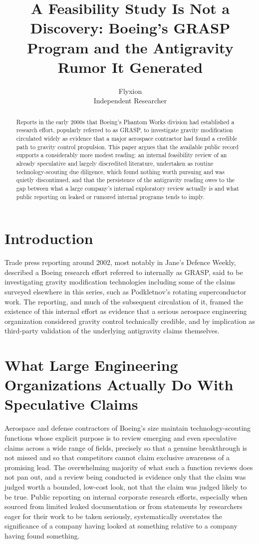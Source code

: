 \documentclass[11pt]{article}
\title{A Feasibility Study Is Not a Discovery: Boeing's GRASP Program and the Antigravity Rumor It Generated}
\author{Flyxion \\ \small Independent Researcher}
\date{}
\begin{document}
\maketitle

\begin{abstract}
Reports in the early 2000s that Boeing's Phantom Works division had established a research effort, popularly referred to as GRASP, to investigate gravity modification circulated widely as evidence that a major aerospace contractor had found a credible path to gravity control propulsion. This paper argues that the available public record supports a considerably more modest reading: an internal feasibility review of an already speculative and largely discredited literature, undertaken as routine technology-scouting due diligence, which found nothing worth pursuing and was quietly discontinued, and that the persistence of the antigravity reading owes to the gap between what a large company's internal exploratory review actually is and what public reporting on leaked or rumored internal programs tends to imply.
\end{abstract}

\section{Introduction}

Trade press reporting around 2002, most notably in Jane's Defence Weekly, described a Boeing research effort referred to internally as GRASP, said to be investigating gravity modification technologies including some of the claims surveyed elsewhere in this series, such as Podkletnov's rotating superconductor work. The reporting, and much of the subsequent circulation of it, framed the existence of this internal effort as evidence that a serious aerospace engineering organization considered gravity control technically credible, and by implication as third-party validation of the underlying antigravity claims themselves.

\section{What Large Engineering Organizations Actually Do With Speculative Claims}

Aerospace and defense contractors of Boeing's size maintain technology-scouting functions whose explicit purpose is to review emerging and even speculative claims across a wide range of fields, precisely so that a genuine breakthrough is not missed and so that competitors cannot claim exclusive awareness of a promising lead. The overwhelming majority of what such a function reviews does not pan out, and a review being conducted is evidence only that the claim was judged worth a bounded, low-cost look, not that the claim was judged likely to be true. Public reporting on internal corporate research efforts, especially when sourced from limited leaked documentation or from statements by researchers eager for their work to be taken seriously, systematically overstates the significance of a company having looked at something relative to a company having found something.
\end{document}
